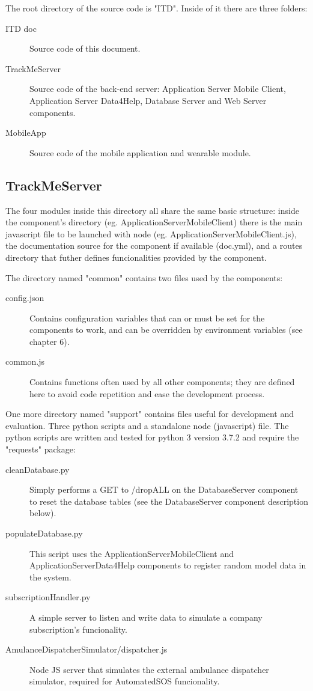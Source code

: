 \documentclass[../main.tex]{subfiles}
\begin{document}
The root directory of the source code is "ITD". Inside of it there are three folders:

\begin{description}
	\item[ITD doc] Source code of this document.
	\item[TrackMeServer] Source code of the back-end server: Application Server Mobile Client, Application Server Data4Help, Database Server and Web Server components.
	\item[MobileApp] Source code of the mobile application and wearable module.
\end{description}

\subsection{TrackMeServer}

The four modules inside this directory all share the same basic structure: inside the component's directory (eg. ApplicationServerMobileClient) there is the main javascript file to be launched with node (eg. ApplicationServerMobileClient.js), the documentation source for the component if available (doc.yml), and a routes directory that futher defines funcionalities provided by the component.

The directory named "common" contains two files used by the components:

\begin{description}
	\item[config.json] Contains configuration variables that can or must be set for the components to work, and can be overridden by environment variables (see chapter 6).
	\item[common.js] Contains functions often used by all other components; they are defined here to avoid code repetition and ease the development process.
\end{description}

One more directory named "support" contains files useful for development and evaluation. Three python scripts and a standalone node (javascript) file. The python scripts are written and tested for python 3 version 3.7.2 and require the "requests" package:

\begin{description}
	\item[cleanDatabase.py] Simply performs a GET to /dropALL on the DatabaseServer component to reset the database tables (see the DatabaseServer component description below).
	\item[populateDatabase.py] This script uses the ApplicationServerMobileClient and ApplicationServerData4Help components to register random model data in the system.
	\item[subscriptionHandler.py] A simple server to listen and write data to simulate a company subscription's funcionality.
	\item[AmulanceDispatcherSimulator/dispatcher.js] Node JS server that simulates the external ambulance dispatcher simulator, required for AutomatedSOS funcionality.
\end{description}
\end{document}
